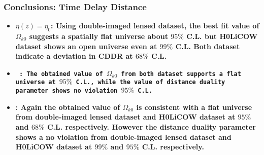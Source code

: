 \documentclass[10pt,xcolor={dvipsnames}]{beamer}
\begin{document}
\begin{frame}
\frametitle{Conclusions: Time Delay Distance}
 \begin{itemize}
 \item
{ \textbf{\small {\color{red}$\eta(z)=\eta_0$}: Using double-imaged lensed dataset, the best fit value of $\Omega_{k0}$ suggests a spatially flat universe about  $95\%$ C.L. but H0LiCOW dataset shows an open universe even at $99\%$ C.L. Both dataset indicate a deviation in CDDR at $68\%$ C.L.
}}
\vspace{2mm}\\
 \item
\texttt{ \textbf{\small {\color{red}{$\eta(z)=1+\eta_1z$}}: The obtained value of  $\Omega_{k0}$ from both dataset supports a flat universe at $95\%$ C.L., while the value of distance duality parameter shows no violation $95\%$ C.L.}}
\vspace{2mm}\\
 \item
 \textbf{\small {}: Again the obtained value of $\Omega_{k0}$  is consistent with a flat universe from double-imaged lensed dataset and H0LiCOW dataset at $95\%$ and $68\%$ C.L. respectively. However the distance duality parameter shows a no violation from double-imaged lensed dataset and H0LiCOW dataset at $99\%$ and $95\%$ C.L. respectively.}


\end{itemize}
\end{frame}
\end{document}
